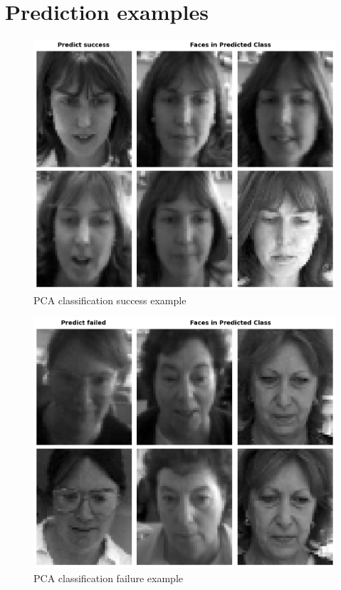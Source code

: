 \section{Prediction examples}
\begin{figure}[H]
  \centering
   \includegraphics[width=0.8\linewidth]{image/q1_success.png}

   \caption{PCA classification success example}
   \label{fig:q3_success}
\end{figure}

\begin{figure}[H]
  \centering
   \includegraphics[width=0.8\linewidth]{image/q1_fail.png}

   \caption{PCA classification failure example}
   \label{fig:q3_fail}
\end{figure}


